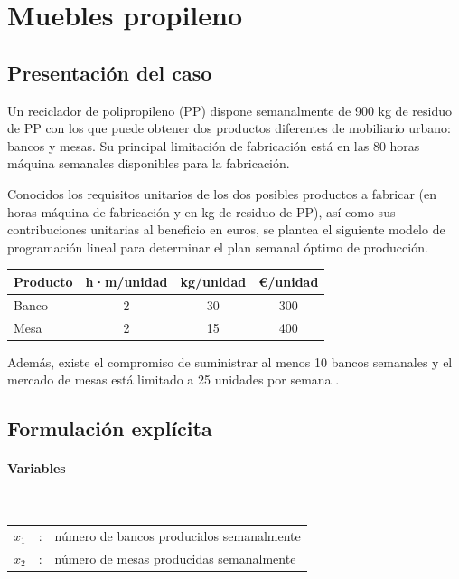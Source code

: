 \section{Muebles propileno}

\subsection{Presentación del caso}
Un reciclador de polipropileno (PP) dispone semanalmente de 900 kg de residuo de PP con los que puede obtener dos 
productos diferentes de mobiliario urbano: bancos y mesas. Su principal limitación de fabricación está en las 80 horas 
máquina semanales disponibles para la fabricación. 

Conocidos los requisitos unitarios de los dos posibles productos a fabricar (en horas-máquina de fabricación y en kg de 
residuo de PP), así como sus contribuciones unitarias al beneficio en euros, se plantea el siguiente modelo de 
programación lineal para determinar el plan semanal óptimo de producción.  

\begin{center}
\begin{tabular}{l c c c}
\hline
Producto & h·m/unidad & kg/unidad & €/unidad \\
\hline
Banco & 2 & 30 & 300 \\
Mesa  & 2 & 15 & 400 \\
\hline
\end{tabular}
\end{center}

Además, existe el compromiso de suministrar al menos 10 bancos semanales y el mercado de mesas está limitado a 25 
unidades por semana .

\subsection{Formulación explícita}

\paragraph{Variables}\mbox{}\\
\begin{tabular}{l c l}
    $x_1$  & : & número de bancos producidos semanalmente\\
    $x_2$  & : & número de mesas producidas semanalmente\\
\end{tabular}

